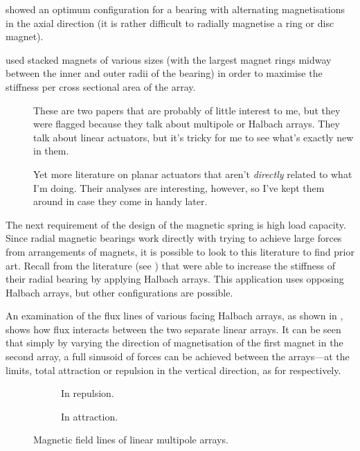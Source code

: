 \textcite{moser2006} showed an optimum configuration for a bearing
with alternating magnetisations in the axial direction (it is rather
difficult to radially magnetise a ring or disc magnet).

\textcite{chen2002} used stacked magnets of various sizes (with the
largest magnet rings midway between the inner and outer radii of the
bearing) in order to maximise the stiffness per cross sectional area of the
array.


\begin{description}
\item[\textcite{jang2005a,jang2005b}] These are two papers that are probably
of little interest to me, but they were flagged because they talk about
multipole or Halbach arrays. They talk about linear actuators, but it's tricky
for me to see what's exactly new in them.
\item[\textcite{filho1999,filho2003}] Yet more literature on planar actuators
that aren't \emph{directly} related to what I'm doing. Their analyses are
interesting, however, so I've kept them around in case they come in handy
later.
\end{description}


The next requirement of the design of the magnetic spring is high load
capacity. Since radial magnetic bearings work directly with trying to achieve
large forces from arrangements of magnets, it is possible to look to this
literature to find prior art. Recall from the literature (see
) that \citeauthor{yonnet1991} were able to increase the
stiffness of their radial bearing by applying Halbach arrays. This application
uses opposing Halbach arrays, but other configurations are possible.

An examination of the flux lines of various facing Halbach arrays, as shown in
, shows how flux interacts between
the two separate linear arrays. It can be seen that simply by varying the
direction of magnetisation of the first magnet in the second array, a full
sinusoid of forces can be achieved between the arrays—at the limits, total
attraction or repulsion in the vertical direction, as for
 respectively.

\begin{figure}
  \begin{subfigure}
  \caption{In repulsion.}
\end{subfigure}
\begin{subfigure}
  \caption{In attraction.}
\end{subfigure}
\caption{Magnetic field lines of linear multipole arrays.}
\end{figure}


